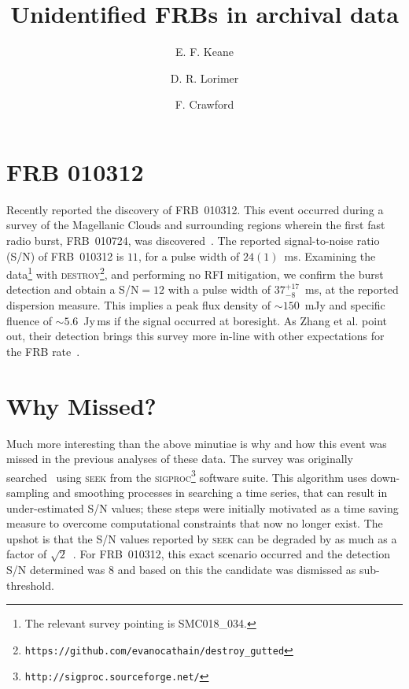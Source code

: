 \documentclass[RNAAS]{aastex62}
\begin{document}
\title{Unidentified FRBs in archival data}


\author[0000-0002-4553-655X]{E. F. Keane}

\author[0000-0003-1301-966X]{D. R. Lorimer}

\author[0000-0002-2578-0360]{F. Crawford}


\section{FRB 010312}

Recently \citet{Zhang2019} reported the discovery of FRB~010312. This event occurred during a survey of the Magellanic Clouds and surrounding regions wherein the first fast radio burst, FRB~010724, was discovered~\citep{Lorimer2007}. The reported signal-to-noise ratio (S/N) of FRB~010312 is $11$, for a pulse width of $24(1)$~ms. Examining the data\footnote{The relevant survey pointing is SMC018\_034.} with \textsc{destroy}\footnote{\texttt{https://github.com/evanocathain/destroy\_gutted}}, and performing no RFI mitigation, we confirm the burst detection and obtain a S/N$=12$ with a pulse width of $37^{+17}_{-8}$~ms, at the reported dispersion measure. This implies a peak flux density of $\sim 150$~mJy and specific fluence of $\sim 5.6$~Jy\,ms if the signal occurred at boresight. As Zhang et al. point out, their detection brings this survey more in-line with other expectations for the FRB rate~\citep{Champion2016,SUPERB2}.

\section{Why Missed?}

Much more interesting than the above minutiae is why and how this event was missed in the previous analyses of these data. The survey was originally searched~\citep{Crawford2016} using \textsc{seek} from the \textsc{sigproc}\footnote{\texttt{http://sigproc.sourceforge.net/}} software suite. This algorithm uses down-sampling and smoothing processes in searching a time series, that can result in under-estimated S/N values; these steps were initially motivated as a time saving measure to overcome computational constraints that now no longer exist. The upshot is that the S/N values reported by \textsc{seek} can be degraded by as much as a factor of $\sqrt{2}$~\citep{kp15}. For FRB~010312, this exact scenario occurred and the detection S/N determined was $8$ and based on this the candidate was dismissed as sub-threshold.
\end{document}
